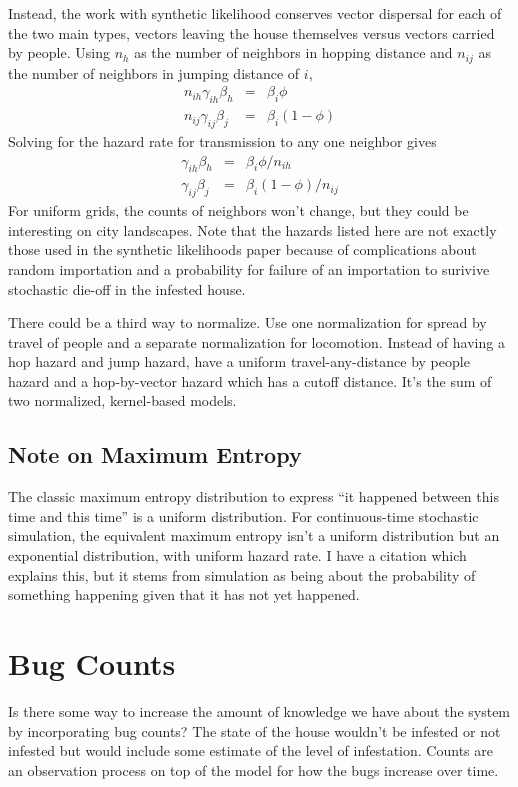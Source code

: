 \documentclass{article}
\begin{document}
Instead, the work with synthetic likelihood conserves vector dispersal
for each of the two main types, vectors leaving the house themselves versus
vectors carried by people. Using $n_h$ as the number of neighbors in hopping
distance and $n_{ij}$ as the number of neighbors in jumping distance of $i$,
\begin{eqnarray}
  n_{ih} \gamma_{ih}\beta_h& =&\beta_i\phi \\
  n_{ij} \gamma_{ij}\beta_j&= &\beta_i(1-\phi)
\end{eqnarray}
Solving for the hazard rate for transmission to any one neighbor gives
\begin{eqnarray}
  \gamma_{ih}\beta_h& =&\beta_i\phi/n_{ih} \\
  \gamma_{ij}\beta_j&= &\beta_i(1-\phi)/n_{ij}
\end{eqnarray}
For uniform grids, the counts of neighbors won't change, but they
could be interesting on city landscapes. Note that the hazards listed
here are not exactly those used in the synthetic likelihoods paper
because of complications about random importation and a probability
for failure of an importation to surivive stochastic die-off in
the infested house.

There could be a third way to normalize. Use one normalization for
spread by travel of people and a separate normalization for locomotion.
Instead of having a hop hazard and jump hazard, have a uniform
travel-any-distance by people hazard and a hop-by-vector hazard
which has a cutoff distance. It's the sum of two normalized, kernel-based
models.

\subsection{Note on Maximum Entropy}
The classic maximum entropy distribution to express ``it happened between
this time and this time'' is a uniform distribution. For continuous-time
stochastic simulation, the equivalent maximum entropy isn't a uniform
distribution but an exponential distribution, with uniform hazard rate.
I have a citation which explains this, but it stems from simulation
as being about the probability of something happening given that it has
not yet happened.


\section{Bug Counts}
Is there some way to increase the amount of knowledge we have about
the system by incorporating bug counts? The state of the house wouldn't
be infested or not infested but would include some estimate of the level
of infestation. Counts are an observation process on top of the model
for how the bugs increase over time.
\end{document}

